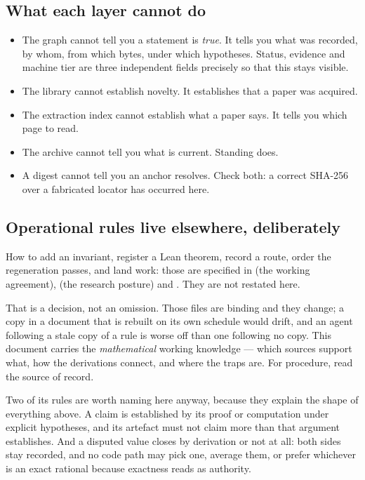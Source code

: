 \subsection{What each layer cannot do}

\begin{itemize}
  \item The graph cannot tell you a statement is \emph{true}. It tells
    you what was recorded, by whom, from which bytes, under which
    hypotheses. Status, evidence and machine tier are three
    independent fields precisely so that this stays visible.
  \item The library cannot establish novelty. It establishes that a
    paper was acquired.
  \item The extraction index cannot establish what a paper says. It
    tells you which page to read.
  \item The archive cannot tell you what is current. Standing does.
  \item A digest cannot tell you an anchor resolves. Check both: a
    correct SHA-256 over a fabricated locator has occurred here.
\end{itemize}

\subsection{Operational rules live elsewhere, deliberately}

How to add an invariant, register a Lean theorem, record a route, order
the regeneration passes, and land work: those are specified in
 (the working agreement),  (the
research posture) and . They are not restated
here.

That is a decision, not an omission. Those files are binding and they
change; a copy in a document that is rebuilt on its own schedule would
drift, and an agent following a stale copy of a rule is worse off than
one following no copy. This document carries the \emph{mathematical}
working knowledge --- which sources support what, how the derivations
connect, and where the traps are. For procedure, read the source of
record.

Two of its rules are worth naming here anyway, because they explain the
shape of everything above. A claim is established by its proof or
computation under explicit hypotheses, and its artefact must not claim
more than that argument establishes. And a disputed value closes by
derivation or not at all: both sides stay recorded, and no code path
may pick one, average them, or prefer whichever is an exact rational
because exactness reads as authority.
